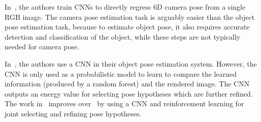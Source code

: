 \documentclass[conference]{IEEEtran}
\newcommand{\junk}[1]{}
\begin{document}
\junk{
The disadvantage of feature learning approaches~\cite{ECCV14,ICCV15,CVPR16,CVPR17_2} is that the generation of pose hypotheses uses only local information, i.e., only three or four pixels are used to generate a hypothesis. As result, this may generate bad hypotheses because it does not consider a global context over the whole object. Furthermore, by requiring multiple processing steps, those approaches are are time-consuming, making them unsuitable for real-time applications. 
}%

In~\cite{DBLP:conf/iccv/KendallGC15,kendall2017posenet}, the authors train CNNs to directly regress 6D camera pose from a single RGB image. The camera pose estimation task is arguably easier than the object pose estimation task, because to estimate object pose, it also requires accurate detection and classification of the object, while these steps are not typically needed for camera pose. 

In~\cite{ICCV15}, the authors use a CNN in their object pose estimation system. However,  %
the CNN is only used as a probabilistic model to learn to compare the learned information (produced by a random forest) and the rendered image. The CNN outputs an energy value for selecting pose hypotheses which are further refined. %
The work in~\cite{CVPR17_2} improves over~\cite{ICCV15} by using a CNN and reinforcement learning for joint selecting and refining pose hypotheses. 
\end{document}
